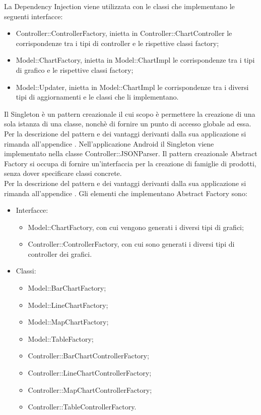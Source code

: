 	La Dependency Injection viene utilizzata con le classi che implementano le seguenti interfacce:
	\begin{itemize}
	\item Controller::ControllerFactory, inietta in Controller::ChartController le corrispondenze tra i tipi di controller e le rispettive classi factory;
	\item Model::ChartFactory, inietta in Model::ChartImpl le  corrispondenze tra i tipi di grafico e le rispettive classi factory;
	\item Model::Updater, inietta in Model::ChartImpl le corrispondenze tra i diversi tipi di aggiornamenti e le classi che li implementano.
	\end{itemize}
	Il Singleton è un pattern creazionale il cui scopo è permettere la creazione di una sola istanza di una classe, nonchè di fornire un punto di accesso globale ad essa.\\
	Per la descrizione del pattern e dei vantaggi derivanti dalla sua applicazione si rimanda all'appendice .
	Nell'applicazione Android il Singleton viene implementato nella classe Controller::JSONParser.
	Il pattern creazionale Abstract Factory si occupa di fornire un'interfaccia per la creazione di famiglie di prodotti, senza dover specificare classi concrete. \\
	Per la descrizione del pattern e dei vantaggi derivanti dalla sua applicazione si rimanda all'appendice .
	Gli elementi che implementano Abstract Factory sono:
	\begin{itemize}
	\item Interfacce:
		\begin{itemize}
			\item Model::ChartFactory, con cui vengono generati i diversi tipi di grafici;
			\item Controller::ControllerFactory, con cui sono generati i diversi tipi di controller dei grafici.
		\end{itemize}
	\item Classi:
		\begin{itemize}
			\item Model::BarChartFactory;
			\item Model::LineChartFactory;
			\item Model::MapChartFactory;
			\item Model::TableFactory;
			\item Controller::BarChartControllerFactory;
			\item Controller::LineChartControllerFactory;
			\item Controller::MapChartControllerFactory;
			\item Controller::TableControllerFactory.
		\end{itemize}
	\end{itemize}
